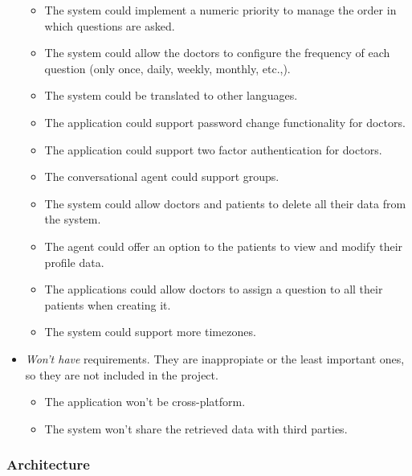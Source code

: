 \documentclass[12pt,english]{article}
\begin{document}
\begin{itemize}
    \begin{itemize}
      \item The system could implement a numeric priority to manage the order in which questions are asked.
      \item The system could allow the doctors to configure the frequency of each question (only once, daily, weekly, monthly, etc.,).
      \item The system could be translated to other languages.
      \item The application could support password change functionality for doctors.
      \item The application could support two factor authentication for doctors.
      \item The conversational agent could support groups.
      \item The system could allow doctors and patients to delete all their data from the system.
      \item The agent could offer an option to the patients to view and modify their profile data.
      \item The applications could allow doctors to assign a question to all their patients when creating it.
      \item The system could support more timezones.
    \end{itemize}
  \item \emph{Won't have} requirements. They are inappropiate or the least important ones, so they are not included in the project.
    \begin{itemize}
      \item The application won't be cross-platform.
      \item The system won't share the retrieved data with third parties.
    \end{itemize}
\end{itemize}
\newpage
\subsubsection{Architecture}
\end{document}
